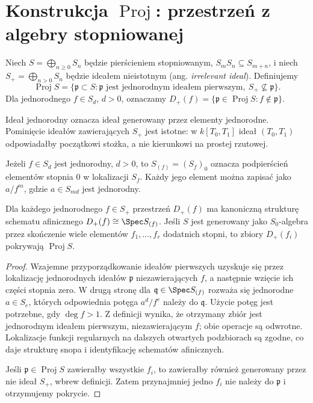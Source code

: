 \section{Konstrukcja \texorpdfstring{$\operatorname{Proj}$}{Proj}: przestrzeń z algebry stopniowanej}
\label{sec:ga5-proj}

\begin{definicja}
Niech $S=\bigoplus_{n\ge0}S_n$ będzie pierścieniem
stopniowanym, $S_mS_n\subseteq S_{m+n}$, i niech
$S_+=\bigoplus_{n>0}S_n$ będzie ideałem nieistotnym
(ang. \emph{irrelevant ideal}). Definiujemy
\[
 \operatorname{Proj}S=
 \{\mathfrak p\subset S:\mathfrak p\text{ jest jednorodnym ideałem
 pierwszym},\ S_+\not\subseteq\mathfrak p\}.
\]
Dla jednorodnego $f\in S_d$, $d>0$, oznaczamy
$D_+(f)=\{\mathfrak p\in\operatorname{Proj}S:f\notin\mathfrak p\}$.
\end{definicja}

Ideał jednorodny oznacza ideał generowany przez elementy
jednorodne. Pominięcie ideałów zawierających $S_+$ jest
istotne: w $k[T_0,T_1]$ ideał $(T_0,T_1)$ odpowiadałby
początkowi stożka, a nie kierunkowi na prostej rzutowej.

\begin{definicja}
Jeżeli $f\in S_d$ jest jednorodny, $d>0$, to
$S_{(f)}=(S_f)_0$ oznacza podpierścień elementów stopnia
$0$ w lokalizacji $S_f$. Każdy jego element można zapisać
jako $a/f^m$, gdzie $a\in S_{md}$ jest jednorodny.
\end{definicja}

\begin{stwierdzenie}
\label{st:ga5-proj-charts}
Dla każdego jednorodnego $f\in S_+$ przestrzeń $D_+(f)$
ma kanoniczną strukturę schematu afinicznego
$D_+(f)\cong\Spec S_{(f)}$. Jeśli $S$ jest generowany
jako $S_0$-algebra przez skończenie wiele elementów
$f_1,\ldots,f_r$ dodatnich stopni, to zbiory $D_+(f_i)$
pokrywają $\operatorname{Proj}S$.
\end{stwierdzenie}
\begin{proof}
Wzajemne przyporządkowanie ideałów pierwszych uzyskuje się
przez lokalizację jednorodnych ideałów $\mathfrak p$
niezawierających $f$, a następnie wzięcie ich części
stopnia zero. W drugą stronę dla
$\mathfrak q\in\Spec S_{(f)}$ rozważa się jednorodne
$a\in S_e$, których odpowiednia potęga $a^d/f^e$
należy do $\mathfrak q$. Użycie potęg jest potrzebne,
gdy $\deg f>1$. Z definicji wynika, że otrzymany zbiór
jest jednorodnym ideałem pierwszym, niezawierającym $f$;
obie operacje są odwrotne. Lokalizacje funkcji regularnych
na dalszych otwartych podzbiorach są zgodne, co daje
strukturę snopa i identyfikację schematów afinicznych.

Jeśli $\mathfrak p\in\operatorname{Proj}S$ zawierałby
wszystkie $f_i$, to zawierałby również generowany
przez nie ideał $S_+$, wbrew definicji. Zatem
przynajmniej jedno $f_i$ nie należy do $\mathfrak p$
i otrzymujemy pokrycie.
\end{proof}

